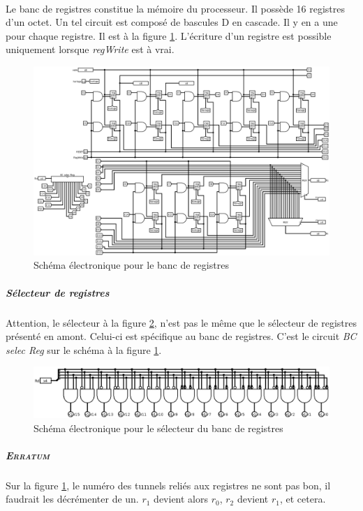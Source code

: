 \paragraph{}{
	Le banc de registres constitue la mémoire du processeur. Il possède
	16 registres d'un octet. Un tel circuit	est composé de bascules
	D en cascade. Il y en a une pour chaque registre. Il est à la figure
	\ref{banc_reg_circ}. \newline
	L'écriture d'un registre est possible uniquement lorsque \textit{regWrite}
	est à vrai.
}

\begin{figure}
	\label{banc_reg_circ}
	\centering
	\includegraphics[scale=0.4,angle=90,origin=c]{circuits/banc_reg.png}
	\caption{Sch\'{e}ma \'{e}lectronique pour le banc de registres}
\end{figure}

	\subparagraph{Sélecteur de registres}{
		Attention, le sélecteur à la figure \ref{banc_reg_selec_circ}, n'est
		pas le même que le sélecteur de registres présenté en amont.
		Celui-ci est spécifique au banc de registres. C'est le circuit
		\textit{BC selec Reg} sur le schéma à la figure \ref{banc_reg_circ}.
	}

\begin{figure}
	\centering
	\includegraphics[scale=0.35,origin=c]{circuits/banc_reg_selec.png}
	\caption{ \label{banc_reg_selec_circ} Sch\'{e}ma \'{e}lectronique pour le sélecteur du banc de registres}
\end{figure}

\subparagraph{\textsc{Erratum}}{
	Sur la figure \ref{banc_reg_circ}, le numéro des tunnels reliés aux
	registres ne sont pas bon, il faudrait les décrémenter de un. $r_{1}$
	devient alors $r_{0}$, $r_{2}$ devient $r_{1}$, et cetera.
}